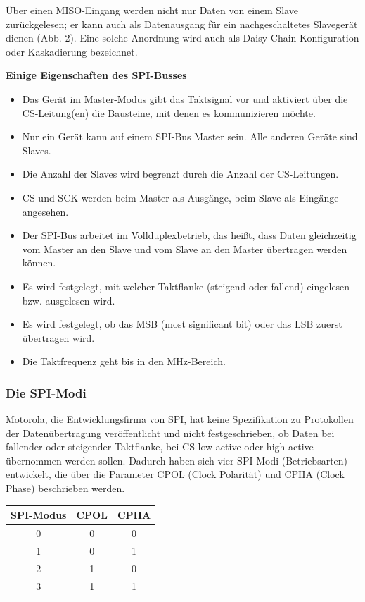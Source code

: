 Über einen MISO-Eingang werden nicht nur Daten von einem Slave zurückgelesen; er kann auch als Datenausgang für ein nachgeschaltetes Slavegerät dienen (Abb. 2). Eine solche Anordnung wird auch als Daisy-Chain-Konfiguration oder Kaskadierung bezeichnet.  

\textbf{Einige Eigenschaften des SPI-Busses}

\begin{itemize}

	\item Das Gerät im Master-Modus gibt das Taktsignal vor und aktiviert über die CS-Leitung(en) die Bausteine, mit denen es kommunizieren möchte.
	\item Nur ein Gerät kann auf einem SPI-Bus Master sein. Alle anderen Geräte sind Slaves.
	\item Die Anzahl der Slaves wird begrenzt durch die Anzahl der CS-Leitungen.
	\item CS und SCK werden beim Master als Ausgänge, beim Slave als Eingänge angesehen.
	\item Der SPI-Bus arbeitet im Vollduplexbetrieb, das heißt, dass Daten gleichzeitig vom Master an den Slave und vom Slave an den Master übertragen werden können.
	\item Es wird festgelegt, mit welcher Taktflanke (steigend oder fallend) eingelesen bzw. ausgelesen wird.
	\item Es wird festgelegt, ob das MSB (most significant bit) oder das LSB zuerst übertragen wird.
	\item Die Taktfrequenz geht bis in den MHz-Bereich.

\end{itemize}

\newpage

\subsubsection{Die SPI-Modi}

Motorola, die Entwicklungsfirma von SPI, hat keine Spezifikation zu Protokollen der Datenübertragung veröffentlicht und nicht festgeschrieben, ob Daten bei fallender oder steigender Taktflanke, bei CS low active oder high active übernommen werden sollen. Dadurch haben sich vier SPI Modi (Betriebsarten) entwickelt, die über die Parameter CPOL (Clock Polarität) und CPHA (Clock Phase) beschrieben werden.

\begin{table}[H]
	\begin{tabular}{|c|c|c|}
		\hline
		SPI-Modus & CPOL & CPHA \\ \hline
		0         & 0    & 0    \\ \hline
		1         & 0    & 1    \\ \hline
		2         & 1    & 0    \\ \hline
		3         & 1    & 1    \\ \hline
	\end{tabular}
\end{table}


